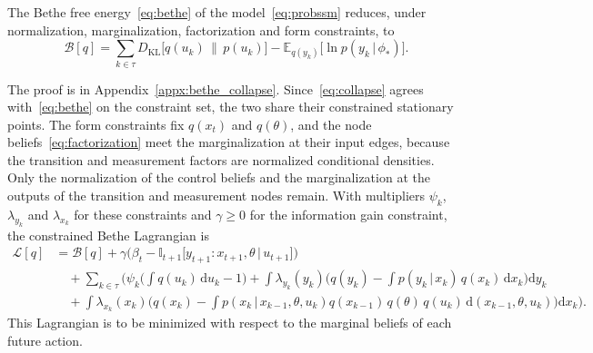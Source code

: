 \documentclass{l4dc2027}
\def\rmd{\mathrm{d}}
\newcommand\given[1][]{\,#1\vert\,}
\newcommand{\E}{\mathbb{E}}
\begin{document}
\begin{lemma}\label{lem:collapse}
The Bethe free energy~\eqref{eq:bethe} of the model~\eqref{eq:probssm} reduces, under normalization, marginalization, factorization and form constraints, to
\begin{equation}\label{eq:collapse}
	\mathcal{B}[q] = \sum_{k\in\tau} D_{\text{KL}} \big[q(u_k) \,\|\, p(u_k) \big] - \E_{q(y_k)} \big[ \ln p(y_k \given \phi_*) \big]  .
\end{equation}
\end{lemma}
The proof is in Appendix~\ref{appx:bethe_collapse}. Since~\eqref{eq:collapse} agrees with~\eqref{eq:bethe} on the constraint set, the two share their constrained stationary points. The form constraints fix $q(x_t)$ and $q(\theta)$, and the node beliefs~\eqref{eq:factorization} meet the marginalization at their input edges, because the transition and measurement factors are normalized conditional densities. Only the normalization of the control beliefs and the marginalization at the outputs of the transition and measurement nodes remain. With multipliers $\psi_k$, $\lambda_{y_k}$ and $\lambda_{x_k}$ for these constraints and $\gamma \geq 0$ for the information gain constraint, the constrained Bethe Lagrangian is
\begin{align}
	\mathcal{L}[q] &= \mathcal{B}[q] + \gamma \Big( \beta_t - \mathbb{I}_{t+1}\big[y_{t+1} : x_{t+1}, \theta \given u_{t+1}\big] \Big) \label{eq:lagrangian} \\
	&\quad + \sum_{k \in \tau} \Big( \psi_k \big( \int q(u_k)\, \rmd u_k - 1 \big)   + \int \lambda_{y_k}(y_k) \big( q(y_k) - \int p(y_k \given x_k)\, q(x_k)\, \rmd x_k \big) \rmd y_k  \nonumber \\
	&\quad + \int \lambda_{x_k}(x_k) \big( q(x_k) - \int p(x_k \given x_{k-1}, \theta, u_k)  q(x_{k-1})\, q(\theta)\, q(u_k)\, \rmd(x_{k-1}, \theta, u_k) \big) \rmd x_k \Big) . \nonumber 
\end{align}
%
This Lagrangian is to be minimized with respect to the marginal beliefs of each future action.
\end{document}
